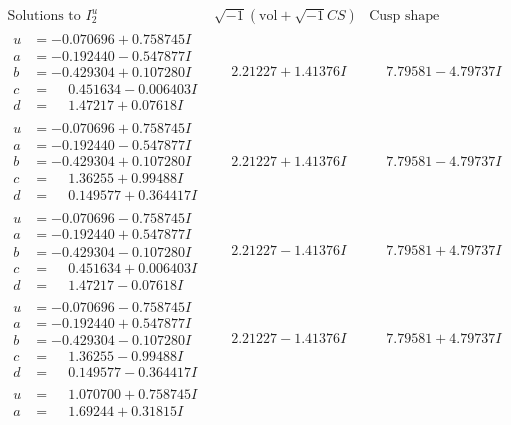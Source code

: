\documentclass[1p]{elsarticle_modified}
\theoremstyle{definition}
\newcommand{\I}{\sqrt{-1}}
\begin{document}
$$\begin{array}{c|c|c}  
\text{Solutions to }I^u_{2}& \I (\text{vol} + \sqrt{-1}CS) & \text{Cusp shape}\\
 \hline 
\begin{aligned}
u &= -0.070696 + 0.758745 I \\
a &= -0.192440 - 0.547877 I \\
b &= -0.429304 + 0.107280 I \\
c &= \phantom{-}0.451634 - 0.006403 I \\
d &= \phantom{-}1.47217 + 0.07618 I\end{aligned}
 & \phantom{-}2.21227 + 1.41376 I & \phantom{-}7.79581 - 4.79737 I \\ \hline\begin{aligned}
u &= -0.070696 + 0.758745 I \\
a &= -0.192440 - 0.547877 I \\
b &= -0.429304 + 0.107280 I \\
c &= \phantom{-}1.36255 + 0.99488 I \\
d &= \phantom{-}0.149577 + 0.364417 I\end{aligned}
 & \phantom{-}2.21227 + 1.41376 I & \phantom{-}7.79581 - 4.79737 I \\ \hline\begin{aligned}
u &= -0.070696 - 0.758745 I \\
a &= -0.192440 + 0.547877 I \\
b &= -0.429304 - 0.107280 I \\
c &= \phantom{-}0.451634 + 0.006403 I \\
d &= \phantom{-}1.47217 - 0.07618 I\end{aligned}
 & \phantom{-}2.21227 - 1.41376 I & \phantom{-}7.79581 + 4.79737 I \\ \hline\begin{aligned}
u &= -0.070696 - 0.758745 I \\
a &= -0.192440 + 0.547877 I \\
b &= -0.429304 - 0.107280 I \\
c &= \phantom{-}1.36255 - 0.99488 I \\
d &= \phantom{-}0.149577 - 0.364417 I\end{aligned}
 & \phantom{-}2.21227 - 1.41376 I & \phantom{-}7.79581 + 4.79737 I \\ \hline\begin{aligned}
u &= \phantom{-}1.070700 + 0.758745 I \\
a &= \phantom{-}1.69244 + 0.31815 I \\

\end{aligned}
\end{array}$$
\end{document}
